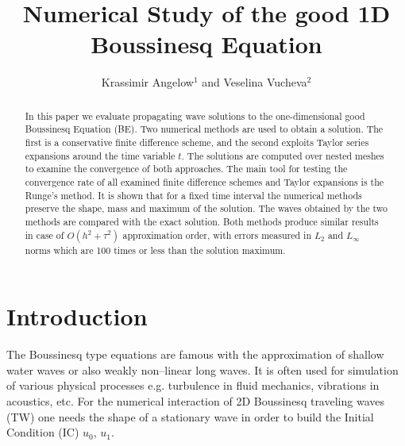 \documentclass[%
 aip,
cp,  
 amsmath,amssymb,
 reprint,
]{iopconfser}
\begin{document}
\title{Numerical Study of the good 1D Boussinesq Equation}

\author{Krassimir Angelow$^{1}$ and Veselina Vucheva$^{2}$}




\begin{abstract}
In this paper we evaluate propagating wave solutions to the one-dimensional good Boussinesq Equation (BE).
Two numerical methods are used to obtain a solution. The first is a conservative finite difference scheme, and the second exploits Taylor series expansions around the time variable $t$. 
The solutions are computed over nested meshes to examine the convergence of both approaches. The main tool for testing the convergence rate of all examined finite difference schemes and Taylor expansions is the Runge's method. It is shown that for a fixed time interval the numerical methods preserve the shape, mass and maximum of the solution. The waves obtained by the two methods are compared with the exact solution.
Both methods produce similar results in case of $O(h^{2} + \tau^2 )$ approximation order, with errors measured in $L_2$ and $L_\infty$ norms which are 100 times or less than the solution maximum. 
\end{abstract}

\section{\label{sec:level1}Introduction}

The Boussinesq type equations are famous with the approximation of shallow water waves or also weakly non--linear long waves. It is often used for simulation of various physical processes e.g. turbulence in fluid mechanics, vibrations in acoustics, etc. For the numerical interaction of 2D Boussinesq traveling waves (TW) one needs the shape of a stationary wave in order to build the Initial Condition (IC) $u_0$, $u_1$.
\end{document}
